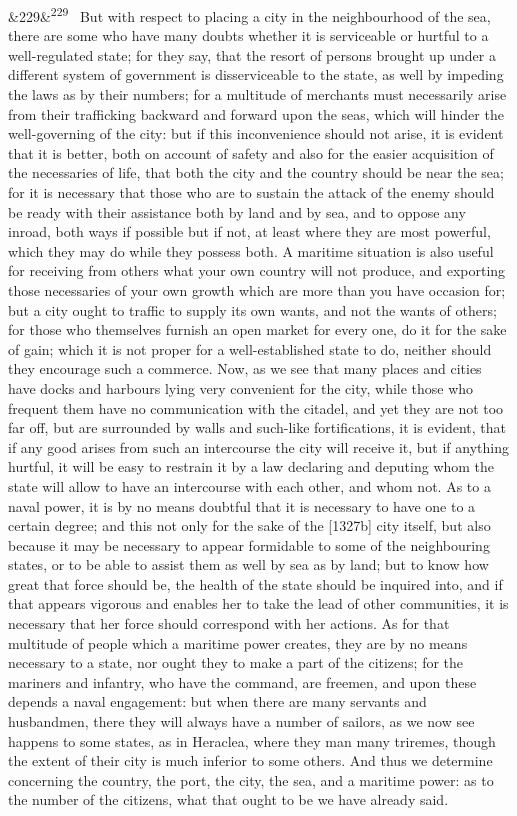 \documentclass[12pt]{article}
\newcommand{\para}[1][]{\par\noindent\ifx&#1&\else\textsuperscript{\footnotesize #1}~\fi}
\begin{document}
\para[229] But with respect to placing a city in the neighbourhood of the sea, there are some who have many doubts whether it is serviceable or hurtful to a well-regulated state; for they say, that the resort of persons brought up under a different system of government is disserviceable to the state, as well by impeding the laws as by their numbers; for a multitude of merchants must necessarily arise from their trafficking backward and forward upon the seas, which will hinder the well-governing of the city: but if this inconvenience should not arise, it is evident that it is better, both on account of safety and also for the easier acquisition of the necessaries of life, that both the city and the country should be near the sea; for it is necessary that those who are to sustain the attack of the enemy should be ready with their assistance both by land and by sea, and to oppose any inroad, both ways if possible but if not, at least where they are most powerful, which they may do while they possess both. A maritime situation is also useful for receiving from others what your own country will not produce, and exporting those necessaries of your own growth which are more than you have occasion for; but a city ought to traffic to supply its own wants, and not the wants of others; for those who themselves furnish an open market for every one, do it for the sake of gain; which it is not proper for a well-established state to do, neither should they encourage such a commerce. Now, as we see that many places and cities have docks and harbours lying very convenient for the city, while those who frequent them have no communication with the citadel, and yet they are not too far off, but are surrounded by walls and such-like fortifications, it is evident, that if any good arises from such an intercourse the city will receive it, but if anything hurtful, it will be easy to restrain it by a law declaring and deputing whom the state will allow to have an intercourse with each other, and whom not. As to a naval power, it is by no means doubtful that it is necessary to have one to a certain degree; and this not only for the sake of the [1327b] city itself, but also because it may be necessary to appear formidable to some of the neighbouring states, or to be able to assist them as well by sea as by land; but to know how great that force should be, the health of the state should be inquired into, and if that appears vigorous and enables her to take the lead of other communities, it is necessary that her force should correspond with her actions. As for that multitude of people which a maritime power creates, they are by no means necessary to a state, nor ought they to make a part of the citizens; for the mariners and infantry, who have the command, are freemen, and upon these depends a naval engagement: but when there are many servants and husbandmen, there they will always have a number of sailors, as we now see happens to some states, as in Heraclea, where they man many triremes, though the extent of their city is much inferior to some others. And thus we determine concerning the country, the port, the city, the sea, and a maritime power: as to the number of the citizens, what that ought to be we have already said.
\end{document}
